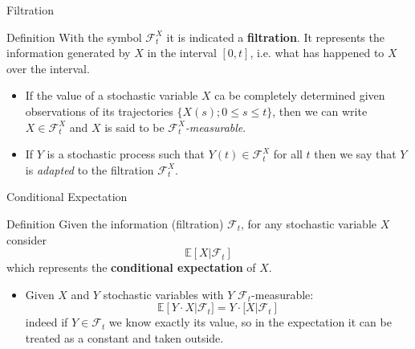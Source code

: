 \documentclass{beamer}
\begin{document}
\begin{frame}{Filtration}
	\begin{block}{Definition}
		With the symbol $\mathcal{F}^X_t$ it is indicated a \textbf{filtration}. It represents the information generated by $X$ in the interval $[0, t]$, i.e. what has happened to $X$ over the interval. 
	\end{block}
	\begin{itemize}	
		\item If the value of a stochastic variable $X$ ca be completely determined given observations of its trajectories $\{X(s); 0\leq s \leq t\}$, then we can write $X\in\mathcal{F}_t^X$ and $X$ is said to be $\mathcal{F}_t^X$\emph{-measurable}.
		\item If $Y$ is a stochastic process such that $Y(t)\in\mathcal{F}_t^X$ for all $t$ then we say that $Y$ is \emph{adapted} to the filtration $\mathcal{F}_t^X$. 
	\end{itemize}
\end{frame}

\begin{frame}{Conditional Expectation}
	\begin{block}{Definition}
		Given the information (filtration) $\mathcal{F}_t$, for any stochastic variable $X$ consider
		\begin{equation*}
			\mathbb{E}[X|\mathcal{F}_t]
		\end{equation*}
		which represents the \textbf{conditional expectation} of $X$.
	\end{block}
	\begin{itemize}
		\item Given $X$ and $Y$ stochastic variables with $Y$ $\mathcal{F}_t$-measurable:
		\begin{equation*}
			\mathbb{E}[Y\cdot X|\mathcal{F}_t] =  Y\cdot\mathbb[X|\mathcal{F}_t]
		\end{equation*}
		indeed if $Y\in\mathcal{F}_t$ we know exactly its value, so in the expectation it can be treated as a constant and taken outside.
	\end{itemize}
\end{frame}
\end{document}
